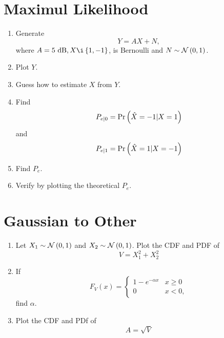 \documentclass[journal,12pt,twocolumn]{IEEEtran}
\renewcommand\thesection{\arabic{section}}
\begin{document}
\section{Maximul Likelihood}
\begin{enumerate}[label=\thesection.\arabic*
,ref=\thesection.\theenumi]
\item Generate 
\begin{equation}
Y = AX+N,
\end{equation}
		where $A = 5 \text{ dB}, X \i \cbrak{1,-1}$,  is Bernoulli and $N \sim \mathcal{N}\left(0,1\right)$.
	\item Plot $Y$.
	\item Guess how to estimate $X$ from $Y$.
\item
\label{ml-ch4_sim}
Find 
\begin{equation}
	P_{e|0} = \Pr\left(\hat{X} = -1|X=1\right)
\end{equation}
and 
\begin{equation}
	P_{e|1} = \Pr\left(\hat{X} = 1|X=-1\right)
\end{equation}
%
\item Find $P_e$.
%
\item
Verify by plotting  the theoretical $P_e$.  
		\end{enumerate}
\section{Gaussian to Other}
\begin{enumerate}[label=\thesection.\arabic*
,ref=\thesection.\theenumi]
\item
Let $X_1 \sim  \mathcal{N}\left(0,1\right)$ and $X_2 \sim  \mathcal{N}\left(0,1\right)$. Plot the CDF and PDF of
%
\begin{equation}
V = X_1^2 + X_2^2
\end{equation}
%
%
%
\item
If
%
\begin{equation}
F_{V}(x) = 
\begin{cases}
1 - e^{-\alpha x} & x \geq 0 \\
0 & x < 0,
\end{cases}
\end{equation}
%
find $\alpha$.
%
\item
\label{ch3_raleigh_sim}
Plot the CDF and PDf of
%
\begin{equation}
A = \sqrt{V}
\end{equation}
%
\end{enumerate}
\end{document}
